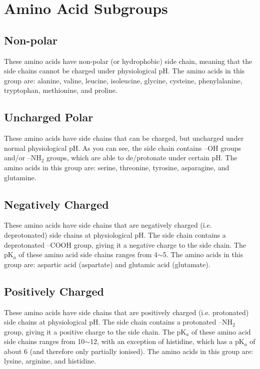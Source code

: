 \documentclass[a4paper, 12pt]{report}
\begin{document}
\section{Amino Acid Subgroups}


\subsection{Non-polar}

These amino acids have non-polar (or hydrophobic) side chain, meaning that the side chains cannot be charged under physiological pH.
The amino acids in this group are: alanine, valine, leucine, isoleucine, glycine, cysteine, phenylalanine, tryptophan, methionine, and proline.

\subsection{Uncharged Polar}

These amino acids have side chains that can be charged, but uncharged under normal physiological pH.
As you can see, the side chain contains --OH groups and/or --NH$_2$ groups, which are able to de/protonate under certain pH.
The amino acids in this group are: serine, threonine, tyrosine, asparagine, and glutamine.


\subsection{Negatively Charged}

These amino acids have side chains that are negatively charged (i.e. deprotonated) side chains at physiological pH.
The side chain contains a deprotonated --COOH group, giving it a negative charge to the side chain.
The pK$_a$ of these amino acid side chains ranges from 4$\sim$5.
The amino acids in this group are: aspartic acid (aspartate) and glutamic acid (glutamate).

\subsection{Positively Charged}

These amino acids have side chains that are positively charged (i.e. protonated) side chains at physiological pH.
The side chain contains a protonated --NH$_2$ group, giving it a positive charge to the side chain.
The pK$_a$ of these amino acid side chains ranges from 10$\sim$12, with an exception of histidine, which has a pK$_a$ of about 6 (and therefore only partially ionised).
The amino acids in this group are: lysine, arginine, and histidine.
\end{document}
